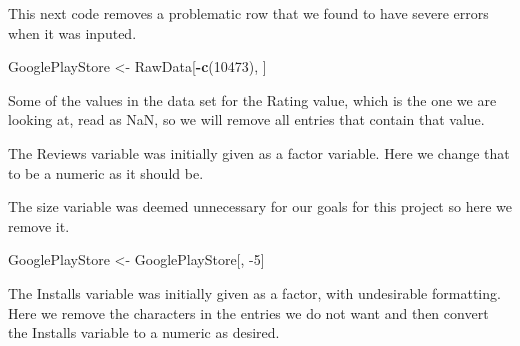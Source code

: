 \documentclass[]{article}
\newenvironment{Shaded}{\begin{snugshade}}{\end{snugshade}}
\newcommand{\DecValTok}[1]{\textcolor[rgb]{0.00,0.00,0.81}{#1}}
\newcommand{\KeywordTok}[1]{\textcolor[rgb]{0.13,0.29,0.53}{\textbf{#1}}}
\newcommand{\NormalTok}[1]{#1}
\newcommand{\OperatorTok}[1]{\textcolor[rgb]{0.81,0.36,0.00}{\textbf{#1}}}
\newcommand{\StringTok}[1]{\textcolor[rgb]{0.31,0.60,0.02}{#1}}
\begin{document}
This next code removes a problematic row that we found to have severe
errors when it was inputed.

\begin{Shaded}
\begin{Highlighting}[]
\NormalTok{GooglePlayStore <-}\StringTok{ }\NormalTok{RawData[}\OperatorTok{-}\KeywordTok{c}\NormalTok{(}\DecValTok{10473}\NormalTok{), ]}
\end{Highlighting}
\end{Shaded}

Some of the values in the data set for the Rating value, which is the
one we are looking at, read as NaN, so we will remove all entries that
contain that value.

\begin{Shaded}
\end{Shaded}

The Reviews variable was initially given as a factor variable. Here we
change that to be a numeric as it should be.

\begin{Shaded}
\end{Shaded}

The size variable was deemed unnecessary for our goals for this project
so here we remove it.

\begin{Shaded}
\begin{Highlighting}[]
\NormalTok{GooglePlayStore <-}\StringTok{ }\NormalTok{GooglePlayStore[, }\DecValTok{-5}\NormalTok{]}
\end{Highlighting}
\end{Shaded}

The Installs variable was initially given as a factor, with undesirable
formatting. Here we remove the characters in the entries we do not want
and then convert the Installs variable to a numeric as desired.
\end{document}
